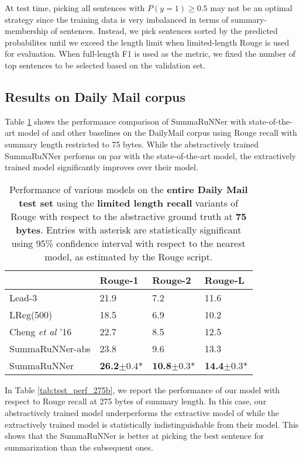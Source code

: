 \documentclass[letterpaper]{article}
\begin{document}
At test time, picking all sentences with $P(y=1)\ge 0.5$ may not be an optimal strategy since the training data is very imbalanced in terms of summary-membership of sentences. Instead, we pick sentences sorted by the predicted probabilites until we exceed the length limit when limited-length Rouge is used for evaluation. When full-length F1 is used as the metric, we fixed the number of top sentences to be selected based on the validation set. 







\subsection{Results on Daily Mail corpus}

Table \ref{tab:test_perf_75b} shows the performance comparison of SummaRuNNer with state-of-the-art model of \cite{jianpeng} and other baselines on the DailyMail corpus using Rouge recall with summary length restricted to 75 bytes. While the abstractively trained SummaRuNNer performs on par with the state-of-the-art model, the extractively trained model significantly improves over their model.



\begin{table}[ht]
\centering
\begin{tabular}{|l|l|l|l|}
\hline
 & Rouge-1 & Rouge-2 & Rouge-L \\
 \hline
Lead-3  & 21.9 & 7.2 & 11.6 \\
LReg(500) & 18.5 & 6.9 & 10.2 \\
Cheng {\it et al} '16 & 22.7 & 8.5 & 12.5 \\
SummaRuNNer-abs & 23.8 & 9.6 & 13.3 \\
SummaRuNNer &  {\bf 26.2}$\pm 0.4$*  & {\bf 10.8}$\pm 0.3$* & {\bf 14.4}$\pm 0.3$* \\
\hline
\end{tabular}
\caption{{\small Performance of various models on the {\bf entire Daily Mail test set} using the {\bf limited length recall} variants of Rouge with respect to the abstractive ground truth at {\bf 75 bytes}.  Entries with asterisk are statistically significant using 95\% confidence interval with respect to the nearest model, as estimated by the Rouge script.}}
\label{tab:test_perf_75b}
\end{table}

In Table \ref{tab:test_perf_275b}, we report the performance of our model with respect to Rouge recall at 275 bytes of summary length. In this case, our abstractively trained model underperforms the extractive model  of \cite{jianpeng} while the extractively trained model is statistically indistinguishable from their model. This shows that the SummaRuNNer is better at picking the best sentence for summarization than the subsequent ones.
\end{document}
